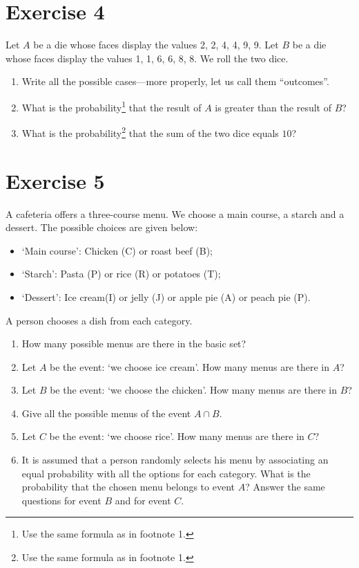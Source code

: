 \documentclass[12pt,thmsa]{article}
\begin{document}
\section*{Exercise 4}
Let $A$ be a die whose faces display the values 2, 2, 4, 4, 9, 9.  Let $B$ be a die whose faces display the
values 1, 1, 6, 6, 8, 8. We roll the two dice.

\begin{enumerate}
\item Write all the possible cases---more properly, let us call them ``outcomes''.
\item What is the probability\footnote{Use the same formula as in footnote 1.} that the result of $A$ is greater than the result of $B$?
\item What is the probability\footnote{Use the same formula as in footnote 1.} that the sum of the two dice equals $10$?
\end{enumerate}


\section*{Exercise 5}
A cafeteria offers a three-course menu. We choose a main course, a starch and a
dessert. The possible choices are given below:

\begin{itemize}
\item `Main course': Chicken (C) or roast beef (B);
\item `Starch': Pasta (P) or rice (R) or potatoes (T);
\item `Dessert': Ice cream(I) or jelly (J) or apple pie (A) or peach pie (P).
\end{itemize}

A person chooses a dish from each category.
\begin{enumerate}
\item How many possible menus are there in the basic set?
\item Let $A$ be the event: `we choose ice cream'. How many menus are there in $A$?
\item Let $B$ be the event: `we choose the chicken'. How many menus are there in $B$?
\item Give all the possible menus of the event $A \cap B$.
\item Let $C$ be the event: `we choose rice'. How many menus are there in $C$?
\item It is assumed that a person randomly selects his menu by associating an equal probability with
all the options for each category. What is the probability that the chosen menu belongs to event $A$?
Answer the same questions for event $B$ and for event $C$.

\end{enumerate}
\end{document}

